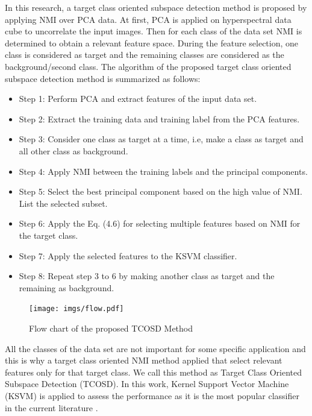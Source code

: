\documentclass[document.tex]{subfiles}
\begin{document}
In this research, a target class oriented subspace detection method is proposed by applying NMI over PCA data. At first, PCA is applied on hyperspectral data cube to uncorrelate the input images. Then for each class of the data set NMI is determined to obtain a relevant feature space. During the feature selection, one class is considered as target and the remaining classes are considered as the background/second class. The algorithm of the proposed target class oriented subspace detection method is summarized as follows:
\begin{itemize}
\item Step 1: Perform PCA and extract features of the input data set.
\item Step 2: Extract the training data and training label from the
PCA features.
\item Step 3: Consider one class as target at a time, i.e, make a class as target and all other class as background. 
\item Step 4: Apply NMI between the training labels and the principal components.
\item Step 5: Select the best principal component based on the high value of NMI. List the selected subset. 
\item Step 6: Apply the Eq. (4.6) for selecting multiple features based on NMI for the target class.
\item Step 7: Apply the selected features to the KSVM classifier.
\item Step 8: Repeat step 3 to 6 by making another class as target and the remaining as background.
\end{itemize}

\begin{figure}[H]
	\begin{center}
		\texttt{[image: imgs/flow.pdf]}
	\end{center}
	\caption{Flow chart of the proposed TCOSD Method}
	\label{fig:Flow chart of the proposed TCOSD Method}
\end{figure}

\noindent All the classes of the data set are not important for some specific application and this is why a target class oriented NMI method applied that select relevant features only for that target class. We call this method as Target Class Oriented Subspace Detection (TCOSD). In this work, Kernel Support Vector Machine (KSVM) is applied to assess the performance as it is the most popular classifier in the current literature \cite{11}. 
\end{document}
